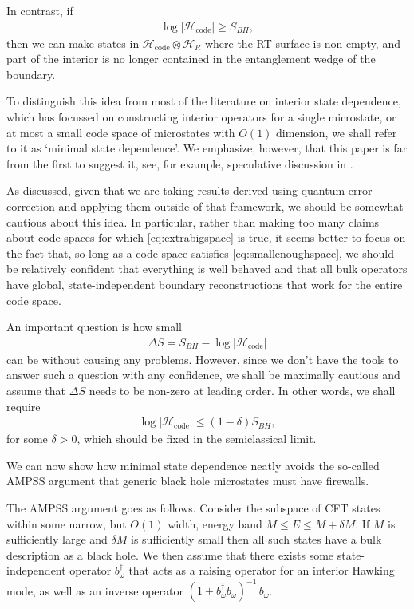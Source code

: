 \documentclass[12pt]{article}
\begin{document}
In contrast, if
\begin{align} \label{eq:extrabigspace}
\log |\mathcal{H}_\text{code}| \geq S_{BH},
\end{align}
then we can make states in $\mathcal{H}_\text{code} \otimes \mathcal{H}_R$ where the RT surface is non-empty, and part of the interior is no longer contained in the entanglement wedge of the boundary.

To distinguish this idea from most of the literature on interior state dependence, which has focussed on constructing interior operators for a single microstate, or at most a small code space of microstates with $O(1)$ dimension, we shall refer to it as `minimal state dependence'. We emphasize, however, that this paper is far from the first to suggest it, see, for example, speculative discussion in \cite{papadodimas2013infalling}.

As discussed, given that we are taking results derived using quantum error correction and applying them outside of that framework, we should be somewhat cautious about this idea. In particular, rather than making too many claims about code spaces for which \eqref{eq:extrabigspace} is true, it seems better to focus on the fact that, so long as a code space satisfies \eqref{eq:smallenoughspace}, we should be relatively confident that everything is well behaved and that all bulk operators have global, state-independent boundary reconstructions that work for the entire code space. 

An important question is how small
\begin{align}
\Delta S = S_{BH} - \log |\mathcal{H}_\text{code}|
\end{align}
can be without causing any problems. However, since we don't have the tools to answer such a question with any confidence, we shall be maximally cautious and assume that $\Delta S$ needs to be non-zero at leading order. In other words, we shall require
\begin{align}
\log |\mathcal{H}_\text{code}| \leq (1-\delta) S_{BH},
\end{align}
for some $\delta > 0$, which should be fixed in the semiclassical limit.

We can now show how minimal state dependence neatly avoids the so-called AMPSS argument \cite{almheiri2013apologia} that generic black hole microstates must have firewalls. 
 
The AMPSS argument goes as follows. Consider the subspace of CFT states within some narrow, but $O(1)$ width, energy band $M \leq E \leq M + \delta M$. If $M$ is sufficiently large and $\delta M$ is sufficiently small then all such states have a bulk description as a black hole. We then assume that there exists some state-independent operator $b_\omega^\dagger$ that acts as a raising operator for an interior Hawking mode, as well as an inverse operator $(1 + b_\omega^\dagger b_\omega)^{-1}\, b_\omega$. 
\end{document}
